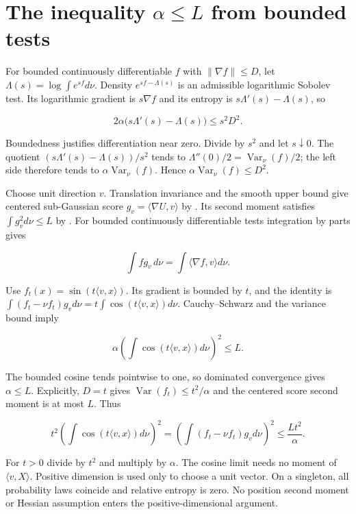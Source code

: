 \documentclass[11pt,a4paper]{article}
\begin{document}
\section{\texorpdfstring{The inequality \(\alpha\le L\) from bounded tests}{The inequality α≤ L from bounded tests}}


For bounded continuously differentiable \(f\) with \(\|\nabla f\|\le D\), let \(\Lambda(s)=\log\int e^{sf}d\nu\). Density \(e^{sf-\Lambda(s)}\) is an admissible logarithmic Sobolev test. Its logarithmic gradient is \(s\nabla f\) and its entropy is \(s\Lambda'(s)-\Lambda(s)\), so

\[2\alpha\bigl(s\Lambda'(s)-\Lambda(s)\bigr)\le s^2D^2.\]

Boundedness justifies differentiation near zero. Divide by \(s^2\) and let \(s\downarrow0\). The quotient \((s\Lambda'(s)-\Lambda(s))/s^2\) tends to \(\Lambda''(0)/2=\operatorname{Var}_\nu(f)/2\); the left side therefore tends to \(\alpha\operatorname{Var}_\nu(f)\). Hence \(\alpha\operatorname{Var}_\nu(f)\le D^2\).



Choose unit direction \(v\). Translation invariance and the smooth upper bound \cite[Section~3.9.1]{LangevinLean2026ULASC} give centered sub-Gaussian score \(g_v=\langle\nabla U,v\rangle\) by \cite[Section~3.27.3]{LangevinLean2026ULASC}. Its second moment satisfies \(\int g_v^2d\nu\le L\) by \cite[Section~3.27.5]{LangevinLean2026ULASC}. For bounded continuously differentiable tests integration by parts gives

\[\int f g_v\,d\nu=\int\langle\nabla f,v\rangle d\nu.\]

Use \(f_t(x)=\sin(t\langle v,x\rangle)\). Its gradient is bounded by \(t\), and the identity is \(\int(f_t-\nu f_t)g_vd\nu=t\int\cos(t\langle v,x\rangle)d\nu\). Cauchy–Schwarz and the variance bound imply

\[\alpha\left(\int\cos(t\langle v,x\rangle)d\nu\right)^2\le L.\]

The bounded cosine tends pointwise to one, so dominated convergence gives \(\alpha\le L\). Explicitly, \(D=t\) gives \(\operatorname{Var}(f_t)\le t^2/\alpha\) and the centered score second moment is at most \(L\). Thus

\[t^2\left(\int\cos(t\langle v,x\rangle)d\nu\right)^2
=\left(\int(f_t-\nu f_t)g_vd\nu\right)^2
\le\frac{Lt^2}{\alpha}.\]

For \(t>0\) divide by \(t^2\) and multiply by \(\alpha\). The cosine limit needs no moment of \(\langle v,X\rangle\). Positive dimension is used only to choose a unit vector. On a singleton, all probability laws coincide and relative entropy is zero. No position second moment or Hessian assumption enters the positive-dimensional argument.
\end{document}
